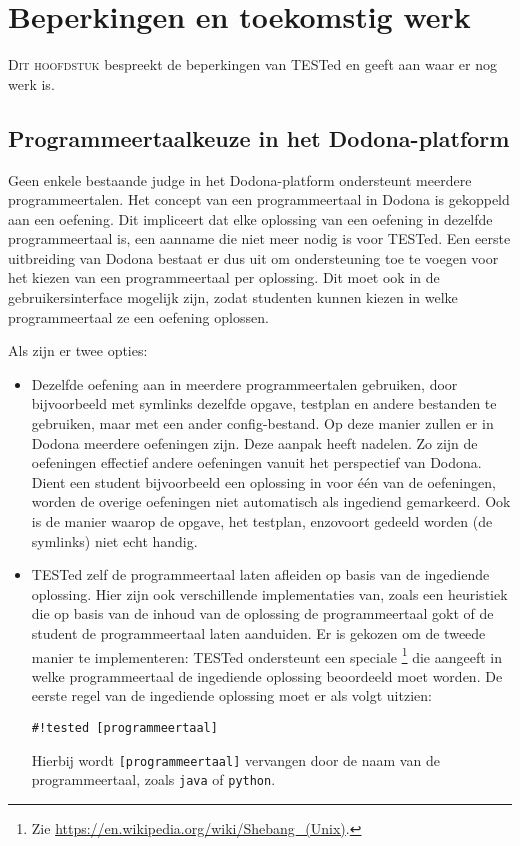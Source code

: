 \chapter{Beperkingen en toekomstig werk}\label{ch:beperkingen-en-toekomstig-werk}

\lettrine{D}{it hoofdstuk} bespreekt de beperkingen van TESTed en geeft aan waar er nog werk is.

\section{Programmeertaalkeuze in het Dodona-platform}\label{sec:programmeertaalkeuze-in-het-dodona-platform}

Geen enkele bestaande judge in het Dodona-platform ondersteunt meerdere programmeertalen.
Het concept van een programmeertaal in Dodona is gekoppeld aan een oefening.
Dit impliceert dat elke oplossing van een oefening in dezelfde programmeertaal is, een aanname die niet meer nodig is voor TESTed.
Een eerste uitbreiding van Dodona bestaat er dus uit om ondersteuning toe te voegen voor het kiezen van een programmeertaal per oplossing.
Dit moet ook in de gebruikersinterface mogelijk zijn, zodat studenten kunnen kiezen in welke programmeertaal ze een oefening oplossen.

Als  zijn er twee opties:
\begin{itemize}
    \item Dezelfde oefening aan in meerdere programmeertalen gebruiken, door bijvoorbeeld met symlinks dezelfde opgave, testplan en andere bestanden te gebruiken, maar met een ander config-bestand.
    Op deze manier zullen er in Dodona meerdere oefeningen zijn.
    Deze aanpak heeft nadelen.
    Zo zijn de oefeningen effectief andere oefeningen vanuit het perspectief van Dodona.
    Dient een student bijvoorbeeld een oplossing in voor één van de oefeningen, worden de overige oefeningen niet automatisch als ingediend gemarkeerd.
    Ook is de manier waarop de opgave, het testplan, enzovoort gedeeld worden (de symlinks) niet echt handig.
    \item TESTed zelf de programmeertaal laten afleiden op basis van de ingediende oplossing.
    Hier zijn ook verschillende implementaties van, zoals een heuristiek die op basis van de inhoud van de oplossing de programmeertaal gokt of de student de programmeertaal laten aanduiden.
    Er is gekozen om de tweede manier te implementeren: TESTed ondersteunt een speciale \footnote{Zie \url{https://en.wikipedia.org/wiki/Shebang_(Unix)}.} die aangeeft in welke programmeertaal de ingediende oplossing beoordeeld moet worden.
    De eerste regel van de ingediende oplossing moet er als volgt uitzien:
    \begin{verbatim}
#!tested [programmeertaal]
    \end{verbatim}
    Hierbij wordt \texttt{[programmeertaal]} vervangen door de naam van de programmeertaal, zoals \texttt{java} of \texttt{python}.
\end{itemize}

